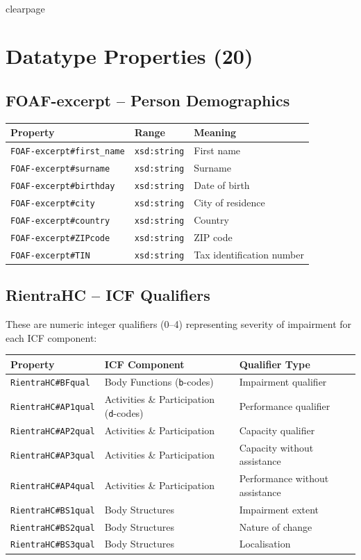 ﻿\documentclass[12pt,a4paper]{article}
\begin{document}
\\clearpage
\section{Datatype Properties (20)}

\subsection{FOAF-excerpt -- Person Demographics}
\begin{longtable}{@{}lll@{}}
\toprule
\textbf{Property} & \textbf{Range} & \textbf{Meaning} \\
\midrule
\endhead
\texttt{FOAF-excerpt\#first\_name} & \texttt{xsd:string} & First name \\
\texttt{FOAF-excerpt\#surname} & \texttt{xsd:string} & Surname \\
\texttt{FOAF-excerpt\#birthday} & \texttt{xsd:string} & Date of birth \\
\texttt{FOAF-excerpt\#city} & \texttt{xsd:string} & City of residence \\
\texttt{FOAF-excerpt\#country} & \texttt{xsd:string} & Country \\
\texttt{FOAF-excerpt\#ZIPcode} & \texttt{xsd:string} & ZIP code \\
\texttt{FOAF-excerpt\#TIN} & \texttt{xsd:string} & Tax identification number \\
\bottomrule
\end{longtable}

\subsection{RientraHC -- ICF Qualifiers}

These are numeric integer qualifiers (0--4) representing severity of impairment for each ICF component:

\begin{longtable}{@{}lll@{}}
\toprule
\textbf{Property} & \textbf{ICF Component} & \textbf{Qualifier Type} \\
\midrule
\endhead
\texttt{RientraHC\#BFqual} & Body Functions (\texttt{b}-codes) & Impairment qualifier \\
\texttt{RientraHC\#AP1qual} & Activities \& Participation (\texttt{d}-codes) & Performance qualifier \\
\texttt{RientraHC\#AP2qual} & Activities \& Participation & Capacity qualifier \\
\texttt{RientraHC\#AP3qual} & Activities \& Participation & Capacity without assistance \\
\texttt{RientraHC\#AP4qual} & Activities \& Participation & Performance without assistance \\
\texttt{RientraHC\#BS1qual} & Body Structures & Impairment extent \\
\texttt{RientraHC\#BS2qual} & Body Structures & Nature of change \\
\texttt{RientraHC\#BS3qual} & Body Structures & Localisation \\
\bottomrule
\end{longtable}
\end{document}
